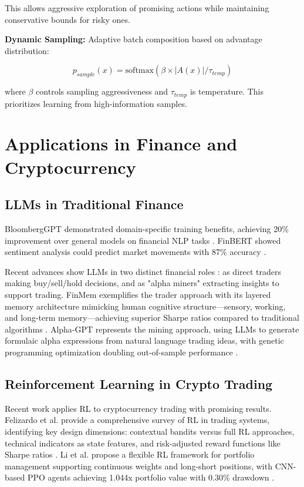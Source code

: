 \documentclass{report}
\begin{document}
This allows aggressive exploration of promising actions while maintaining conservative bounds for risky ones.

\textbf{Dynamic Sampling:} Adaptive batch composition based on advantage distribution:

\begin{equation}
p_{sample}(x) = \text{softmax}\left(\beta \times |A(x)| / \tau_{temp}\right)
\end{equation}

where $\beta$ controls sampling aggressiveness and $\tau_{temp}$ is temperature. This prioritizes learning from high-information samples.

\section{Applications in Finance and Cryptocurrency}

\subsection{LLMs in Traditional Finance}

BloombergGPT demonstrated domain-specific training benefits, achieving 20\% improvement over general models on financial NLP tasks \cite{Wu2023}. FinBERT showed sentiment analysis could predict market movements with 87\% accuracy \cite{Araci2019}. 

Recent advances show LLMs in two distinct financial roles \cite{Ding2024}: as direct traders making buy/sell/hold decisions, and as "alpha miners" extracting insights to support trading. FinMem exemplifies the trader approach with its layered memory architecture mimicking human cognitive structure—sensory, working, and long-term memory—achieving superior Sharpe ratios compared to traditional algorithms \cite{Yu2023}. Alpha-GPT represents the mining approach, using LLMs to generate formulaic alpha expressions from natural language trading ideas, with genetic programming optimization doubling out-of-sample performance \cite{Wang2023b}.

\subsection{Reinforcement Learning in Crypto Trading}

Recent work applies RL to cryptocurrency trading with promising results. Felizardo et al. provide a comprehensive survey of RL in trading systems, identifying key design dimensions: contextual bandits versus full RL approaches, technical indicators as state features, and risk-adjusted reward functions like Sharpe ratios \cite{Felizardo2022}. Li et al. propose a flexible RL framework for portfolio management supporting continuous weights and long-short positions, with CNN-based PPO agents achieving 1.044x portfolio value with 0.30\% drawdown \cite{Li2019}.
\end{document}
